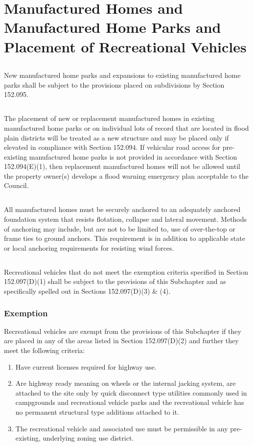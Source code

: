 \section{Manufactured Homes and Manufactured Home Parks and Placement of Recreational Vehicles}
\subsection{}
New manufactured home parks and expansions to existing manufactured home parks shall be subject to the provisions placed on subdivisions by Section 152.095.
\subsection{}
The placement of new or replacement manufactured homes in existing manufactured home parks or on individual lots of record that are located in flood plain districts will be treated as a new structure and may be placed only if elevated in compliance with Section 152.094. If vehicular road access for pre-existing manufactured home parks is not provided in accordance with Section 152.094(E)(1), then replacement manufactured homes will not be allowed until the property owner(s) develops a flood warning emergency plan acceptable to the Council.
\subsection{}
All manufactured homes must be securely anchored to an adequately anchored foundation system that resists flotation, collapse and lateral movement. Methods of anchoring may include, but are not to be limited to, use of over-the-top or frame ties to ground anchors. This requirement is in addition to applicable state or local anchoring requirements for resisting wind forces.
\subsection{}
Recreational vehicles that do not meet the exemption criteria specified in Section 152.097(D)(1) shall be subject to the provisions of this Subchapter and as specifically spelled out in Sections 152.097(D)(3) \& (4).
\subsubsection{Exemption} Recreational vehicles are exempt from the provisions of this Subchapter if they are placed in any of the areas listed in Section 152.097(D)(2) and further they meet the following criteria:
\begin{enumerate}[{\indent}a)]
    \item Have current licenses required for highway use.
    \item Are highway ready meaning on wheels or the internal jacking system, are attached to the site only by quick disconnect type utilities commonly used in campgrounds and recreational vehicle parks and the recreational vehicle has no permanent structural type additions attached to it.
    \item The recreational vehicle and associated use must be permissible in any pre-existing, underlying zoning use district.
\end{enumerate}

